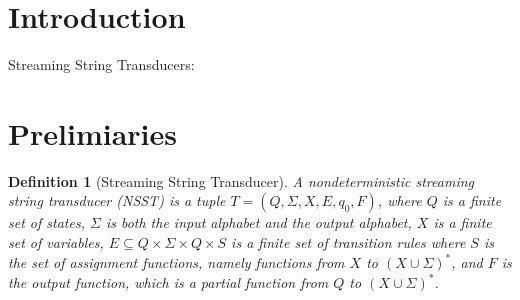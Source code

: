 \documentclass[sigplan,review,anonymous]{acmart}\settopmatter{printfolios=true,printccs=false,printacmref=false}
\newtheorem{definition}{Definition}
\begin{document}




\maketitle

\newcommand\NSST{{\sf NSST}}

\newcommand\refexp{{\sf REF}}



\section{Introduction}

Streaming String Transducers: \cite{FR17}

\section{Prelimiaries}

\begin{definition}[Streaming String Transducer]
  A nondeterministic streaming string transducer (\NSST) is a tuple $T = (Q, \Sigma, X, E, q_0, F)$, where $Q$ is a finite set of states, $\Sigma$ is both the input alphabet and the output alphabet, $X$ is a finite set of variables, $E \subseteq Q \times \Sigma \times Q \times S$ is a finite set of
  transition rules where $S$ is the set of assignment functions, namely functions from $X$ to $(X
  \cup \Sigma)^{\ast}$, and $F$ is the output function, which is a partial function from $Q$ to $(X \cup
  \Sigma)^{\ast}$.
  \end{definition}
  
\end{document}
